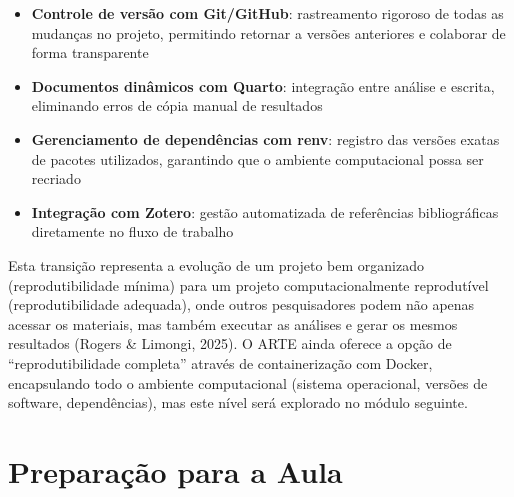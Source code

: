 \documentclass[
  a4paper,
]{book}
\providecommand{\tightlist}{%
  \setlength{\itemsep}{0pt}\setlength{\parskip}{0pt}}\usepackage{longtable,booktabs,array}
\begin{document}
\begin{itemize}
\tightlist
\item
  \textbf{Controle de versão com Git/GitHub}: rastreamento rigoroso de
  todas as mudanças no projeto, permitindo retornar a versões anteriores
  e colaborar de forma transparente
\item
  \textbf{Documentos dinâmicos com Quarto}: integração entre análise e
  escrita, eliminando erros de cópia manual de resultados
\item
  \textbf{Gerenciamento de dependências com renv}: registro das versões
  exatas de pacotes utilizados, garantindo que o ambiente computacional
  possa ser recriado
\item
  \textbf{Integração com Zotero}: gestão automatizada de referências
  bibliográficas diretamente no fluxo de trabalho
\end{itemize}

Esta transição representa a evolução de um projeto bem organizado
(reprodutibilidade mínima) para um projeto computacionalmente
reprodutível (reprodutibilidade adequada), onde outros pesquisadores
podem não apenas acessar os materiais, mas também executar as análises e
gerar os mesmos resultados (Rogers \& Limongi, 2025). O ARTE ainda
oferece a opção de ``reprodutibilidade completa'' através de
containerização com Docker, encapsulando todo o ambiente computacional
(sistema operacional, versões de software, dependências), mas este nível
será explorado no módulo seguinte.

\section{Preparação para a Aula}\label{preparauxe7uxe3o-para-a-aula-5}
\end{document}
